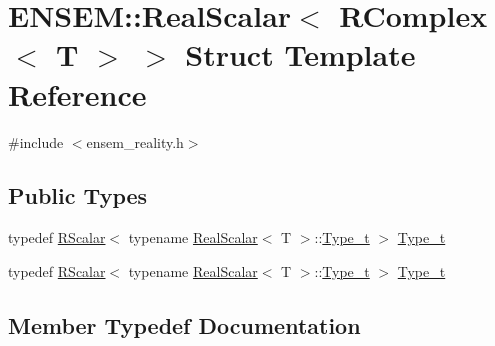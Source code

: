 \hypertarget{structENSEM_1_1RealScalar_3_01RComplex_3_01T_01_4_01_4}{}\section{E\+N\+S\+EM\+:\+:Real\+Scalar$<$ R\+Complex$<$ T $>$ $>$ Struct Template Reference}
\label{structENSEM_1_1RealScalar_3_01RComplex_3_01T_01_4_01_4}


{\ttfamily \#include $<$ensem\+\_\+reality.\+h$>$}

\subsection*{Public Types}
\begin{DoxyCompactItemize}
\item 
typedef \mbox{\hyperlink{classENSEM_1_1RScalar}{R\+Scalar}}$<$ typename \mbox{\hyperlink{structENSEM_1_1RealScalar}{Real\+Scalar}}$<$ T $>$\+::\mbox{\hyperlink{structENSEM_1_1RealScalar_3_01RComplex_3_01T_01_4_01_4_a8e52d83700f12173749eb640b815684c}{Type\+\_\+t}} $>$ \mbox{\hyperlink{structENSEM_1_1RealScalar_3_01RComplex_3_01T_01_4_01_4_a8e52d83700f12173749eb640b815684c}{Type\+\_\+t}}
\item 
typedef \mbox{\hyperlink{classENSEM_1_1RScalar}{R\+Scalar}}$<$ typename \mbox{\hyperlink{structENSEM_1_1RealScalar}{Real\+Scalar}}$<$ T $>$\+::\mbox{\hyperlink{structENSEM_1_1RealScalar_3_01RComplex_3_01T_01_4_01_4_a8e52d83700f12173749eb640b815684c}{Type\+\_\+t}} $>$ \mbox{\hyperlink{structENSEM_1_1RealScalar_3_01RComplex_3_01T_01_4_01_4_a8e52d83700f12173749eb640b815684c}{Type\+\_\+t}}
\end{DoxyCompactItemize}


\subsection{Member Typedef Documentation}
\mbox{\label{structENSEM_1_1RealScalar_3_01RComplex_3_01T_01_4_01_4_a8e52d83700f12173749eb640b815684c}} 
